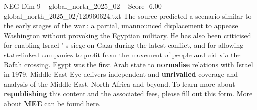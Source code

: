 \begin{textsample}{NEG Dim 9 – global\_north\_2025\_02 – Score -6.00 – global\_north\_2025\_02/120960624.txt}
The source predicted a scenario similar to the early stages of the war : a partial, unannounced displacement to appease Washington without provoking the Egyptian military.
He has also been criticised for enabling Israel ' s siege on Gaza during the latest conflict, and for allowing state-linked companies to profit from the movement of people and aid via the Rafah crossing.
Egypt was the first Arab state to \textbf{normalise} relations with Israel in 1979.
Middle East Eye delivers independent and \textbf{unrivalled} coverage and analysis of the Middle East, North Africa and beyond.
To learn more about \textbf{republishing} this content and the associated fees, please fill out this form.
More about \textbf{MEE} can be found here.

\end{textsample}
